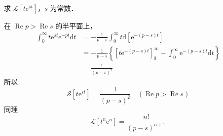\begin{example}{}
求 $\mathscr L[t\mathrm e^{st}]$，$s$ 为常数．

在 $\operatorname{Re} p>\operatorname{Re} s$ 的半平面上，
\begin{equation}
\begin{aligned} \int_{0}^{\infty} t \mathrm{e}^{s t} \mathrm{e}^{-p t} \mathrm{d} t &=-\frac{1}{p-s} \int_{0}^{\infty} t \mathrm{d}\left[\mathrm{e}^{-(p-s) t}\right] \\ &=-\frac{1}{p-s}\left\{\left[t \mathrm{e}^{-(p-s) t}\right]_{0}^{\infty}-\int_{0}^{\infty} \mathrm{e}^{-(p-s) t} \mathrm{d} t\right\} \\ &=\frac{1}{(p-s)^{2}} \end{aligned}
\end{equation}
所以
\begin{equation}
\mathscr{S}\left[t \mathrm{e}^{s t}\right]=\frac{1}{(p-s)^{2}} \quad(\operatorname{Re} p>\operatorname{Re} s)
\end{equation}
同理
\begin{equation}
\mathscr{L}\left[t^{n} \mathrm{e}^{n}\right]=\frac{n !}{(p-s)^{n+1}}
\end{equation}
\end{example}
